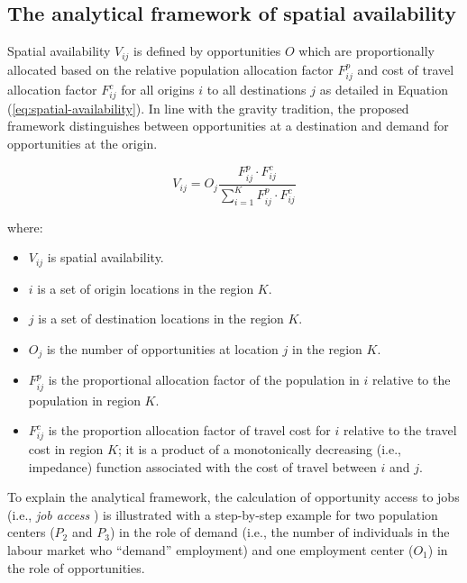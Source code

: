 \documentclass[]{elsarticle} %
\providecommand{\tightlist}{%
  \setlength{\itemsep}{0pt}\setlength{\parskip}{0pt}}
\begin{document}
\hypertarget{the-analytical-framework-of-spatial-availability}{%
\subsection{The analytical framework of spatial
availability}\label{the-analytical-framework-of-spatial-availability}}

Spatial availability \(V_{ij}\) is defined by opportunities \(O\) which
are proportionally allocated based on the relative population allocation
factor \(F^p_{ij}\) and cost of travel allocation factor \(F^c_{ij}\)
for all origins \(i\) to all destinations \(j\) as detailed in Equation
(\ref{eq:spatial-availability}). In line with the gravity tradition, the
proposed framework distinguishes between opportunities at a destination
and demand for opportunities at the origin.

\begin{equation}
\label{eq:spatial-availability}
V_{ij} = O_j\frac{F^p_{ij} \cdot F^c_{ij}}{\sum_{i=1}^K F^p_{ij} \cdot F^c_{ij}}
\end{equation}

\noindent where:

\begin{itemize}
\tightlist
\item
  \(V_{ij}\) is spatial availability.
\item
  \(i\) is a set of origin locations in the region \(K\).
\item
  \(j\) is a set of destination locations in the region \(K\).
\item
  \(O_j\) is the number of opportunities at location \(j\) in the region
  \(K\).
\item
  \(F^p_{ij}\) is the proportional allocation factor of the population
  in \(i\) relative to the population in region \(K\).
\item
  \(F^c_{ij}\) is the proportion allocation factor of travel cost for
  \(i\) relative to the travel cost in region \(K\); it is a product of
  a monotonically decreasing (i.e., impedance) function associated with
  the cost of travel between \(i\) and \(j\).
\end{itemize}

To explain the analytical framework, the calculation of opportunity
access to jobs (i.e., \emph{job access} ) is illustrated with a
step-by-step example for two population centers (\(P_2\) and \(P_3\)) in
the role of demand (i.e., the number of individuals in the labour market
who ``demand'' employment) and one employment center (\(O_1\)) in the
role of opportunities.
\end{document}

